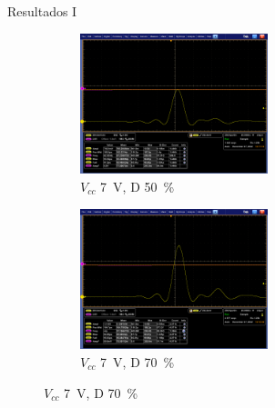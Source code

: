 \documentclass{beamer}
\begin{document}
\begin{frame}{Resultados I}
    \begin{figure}[t!]
        \centering
        \begin{subfigure}[b]{0.49\textwidth}
            \centering
            \includegraphics[width=0.6\textwidth]{images/mediciones/vcc_7v_duty_50.png}
            \caption{$V_{cc}$ \qty{7}{\volt}, D \qty{50}{\percent} }
            \label{fig:mediciones_7v_50}
        \end{subfigure}
        \hfill
        \begin{subfigure}[b]{0.49\textwidth}
            \centering
            \includegraphics[width=0.6\textwidth]{images/mediciones/vcc_7v_duty_70.png}
            \caption{$V_{cc}$ \qty{7}{\volt}, D \qty{70}{\percent} }
            \label{fig:mediciones_7v_70}
        \end{subfigure}
        \label{fig:mediciones_7v}
    \end{figure}
\end{frame}
\end{document}
